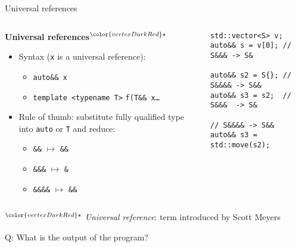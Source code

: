 \begin{frame}[fragile]{Universal references}
    \begin{columns}
        \begin{column}{.5\textwidth}
            \textbf{Universal references${}^{\color{vertexDarkRed}\star}$}
            \begin{itemize}
                \item Syntax (\texttt{x} is a universal reference):
                \begin{itemize}
                    \item \texttt{auto\&\& x}
                    \item \texttt{template <typename T>} \texttt{f(T\&\& x\ldots}
                \end{itemize}
                \item Rule of thumb: substitute fully qualified type into \texttt{auto} or \texttt{T} and reduce:
                \begin{itemize}
                    \item \texttt{\&\&} $\mapsto$ \texttt{\&\&} 
                    \item \texttt{\&\&\&} $\mapsto$ \texttt{\&} 
                    \item \texttt{\&\&\&\&} $\mapsto$ \texttt{\&\&} 
                \end{itemize}
            \end{itemize}
        \end{column}
        \begin{column}{.45\textwidth}
            \begin{lstlisting}[numbers=none]
std::vector<S> v;
auto&& s = v[0]; // S&&& -> S&

auto&& s2 = S{}; // S&&&& -> S&&
auto&& s3 = s2;  // S&&&  -> S&

// S&&&& -> S&&
auto&& s3 = std::move(s2);
            \end{lstlisting}
        \end{column}
    \end{columns}

    \vspace{5mm}

    \footnotesize ${}^{\color{vertexDarkRed}\star}$ \textit{Universal reference}: term introduced by Scott Meyers
\end{frame}

\begin{frame}[fragile]{Q: What is the output of the program?}
\end{frame}

